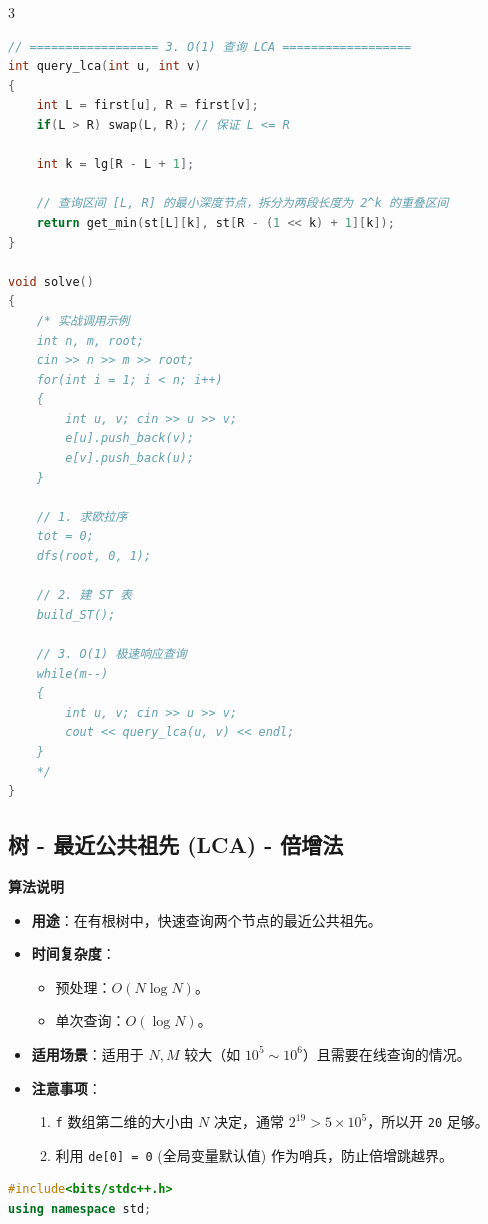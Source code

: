 \documentclass[10pt,landscape,a4paper]{article}
\begin{document}
\begin{multicols*}{3}
\begin{lstlisting}[language=C++]
// ================== 3. O(1) 查询 LCA ==================
int query_lca(int u, int v)
{
    int L = first[u], R = first[v];
    if(L > R) swap(L, R); // 保证 L <= R
    
    int k = lg[R - L + 1];
    
    // 查询区间 [L, R] 的最小深度节点，拆分为两段长度为 2^k 的重叠区间
    return get_min(st[L][k], st[R - (1 << k) + 1][k]);
}

void solve()
{
    /* 实战调用示例
    int n, m, root; 
    cin >> n >> m >> root;
    for(int i = 1; i < n; i++)
    {
        int u, v; cin >> u >> v;
        e[u].push_back(v);
        e[v].push_back(u);
    }
    
    // 1. 求欧拉序
    tot = 0;
    dfs(root, 0, 1);
    
    // 2. 建 ST 表
    build_ST();
    
    // 3. O(1) 极速响应查询
    while(m--)
    {
        int u, v; cin >> u >> v;
        cout << query_lca(u, v) << endl;
    }
    */
}
\end{lstlisting}
\subsection*{树 - 最近公共祖先 (LCA) - 倍增法}
\par\addvspace{0.7ex}\noindent\textbf{算法说明}\par\nobreak
\begin{itemize}
\item \textbf{用途}：在有根树中，快速查询两个节点的最近公共祖先。
\item \textbf{时间复杂度}：
\begin{itemize}
\item 预处理：$O(N \log N)$。
\item 单次查询：$O(\log N)$。
\end{itemize}
\item \textbf{适用场景}：适用于 $N, M$ 较大（如 $10^5 \sim 10^6$）且需要在线查询的情况。
\item \textbf{注意事项}：
\begin{enumerate}[start=1]
\item \texttt{f} 数组第二维的大小由 $N$ 决定，通常 $2^{19} > 5 \times 10^5$，所以开 \texttt{2\allowbreak{}0} 足够。
\item 利用 \texttt{d\allowbreak{}e\allowbreak{}[\allowbreak{}0\allowbreak{}]\allowbreak{} \allowbreak{}=\allowbreak{} \allowbreak{}0} (全局变量默认值) 作为哨兵，防止倍增跳越界。
\end{enumerate}
\end{itemize}
\par{}\par
\begin{lstlisting}[language=C++]
#include<bits/stdc++.h>
using namespace std;


\end{lstlisting}
\end{multicols*}
\end{document}
